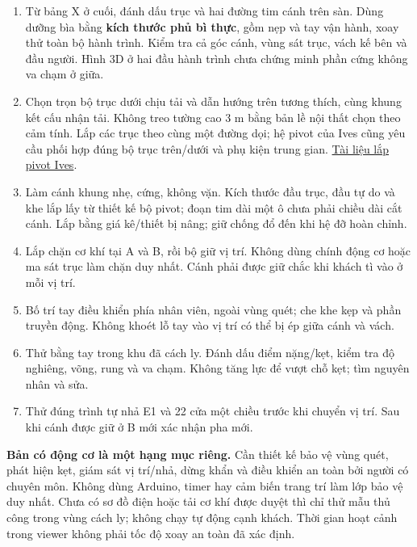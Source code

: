 \documentclass[
  11pt,
  a4paper,
]{article}
\providecommand{\tightlist}{%
  \setlength{\itemsep}{0pt}\setlength{\parskip}{0pt}}
\begin{document}
\begin{enumerate}
\def\labelenumi{\arabic{enumi}.}
\tightlist
\item
  Từ bảng X ở cuối, đánh dấu trục và hai đường tim cánh trên sàn. Dùng
  dưỡng bìa bằng \textbf{kích thước phủ bì thực}, gồm nẹp và tay vận
  hành, xoay thử toàn bộ hành trình. Kiểm tra cả góc cánh, vùng sát
  trục, vách kế bên và đầu người. Hình 3D ở hai đầu hành trình chưa
  chứng minh phần cứng không va chạm ở giữa.
\item
  Chọn trọn bộ trục dưới chịu tải và dẫn hướng trên tương thích, cùng
  khung kết cấu nhận tải. Không treo tường cao 3 m bằng bản lề nội thất
  chọn theo cảm tính. Lắp các trục theo cùng một đường dọi; hệ pivot của
  Ives cũng yêu cầu phối hợp đúng bộ trục trên/dưới và phụ kiện trung
  gian.
  \href{https://us.allegion.com/content/dam/allegion-us-2/web-files/ives/installation-documents/Ives_7244F_7245F_1-1_2in_Intermediate_Pivot_Installation_Instructions_107133.pdf}{Tài
  liệu lắp pivot Ives}.
\item
  Làm cánh khung nhẹ, cứng, không vặn. Kích thước đầu trục, đầu tự do và
  khe lắp lấy từ thiết kế bộ pivot; đoạn tim dài một ô chưa phải chiều
  dài cắt cánh. Lắp bằng giá kê/thiết bị nâng; giữ chống đổ đến khi hệ
  đỡ hoàn chỉnh.
\item
  Lắp chặn cơ khí tại A và B, rồi bộ giữ vị trí. Không dùng chính động
  cơ hoặc ma sát trục làm chặn duy nhất. Cánh phải được giữ chắc khi
  khách tì vào ở mỗi vị trí.
\item
  Bố trí tay điều khiển phía nhân viên, ngoài vùng quét; che khe kẹp và
  phần truyền động. Không khoét lỗ tay vào vị trí có thể bị ép giữa cánh
  và vách.
\item
  Thử bằng tay trong khu đã cách ly. Đánh dấu điểm nặng/kẹt, kiểm tra độ
  nghiêng, võng, rung và va chạm. Không tăng lực để vượt chỗ kẹt; tìm
  nguyên nhân và sửa.
\item
  Thử đúng trình tự nhả E1 và 22 cửa một chiều trước khi chuyển vị trí.
  Sau khi cánh được giữ ở B mới xác nhận pha mới.
\end{enumerate}

\textbf{Bản có động cơ là một hạng mục riêng.} Cần thiết kế bảo vệ vùng
quét, phát hiện kẹt, giám sát vị trí/nhả, dừng khẩn và điều khiển an
toàn bởi người có chuyên môn. Không dùng Arduino, timer hay cảm biến
trang trí làm lớp bảo vệ duy nhất. Chưa có sơ đồ điện hoặc tải cơ khí
được duyệt thì chỉ thử mẫu thủ công trong vùng cách ly; không chạy tự
động cạnh khách. Thời gian hoạt cảnh trong viewer không phải tốc độ xoay
an toàn đã xác định.
\end{document}
